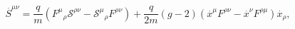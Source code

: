 \begin{equation}
\stackrel{.}{S}^{\mu \nu }=\frac{q}{m}\left( F^{\mu }{}_{\rho }\mathcal{S}%
^{\rho \nu }-\mathcal{S}^{\mu }{}_{\rho }F^{\rho \nu }\right) +\frac{q}{2m}%
(g-2)\left( \stackrel{.}{x}^{\mu }F^{\rho \nu }{}-\stackrel{.}{x}^{\nu
}F^{\rho \mu }\right) \stackrel{.}{x}_{\rho },
\end{equation}

